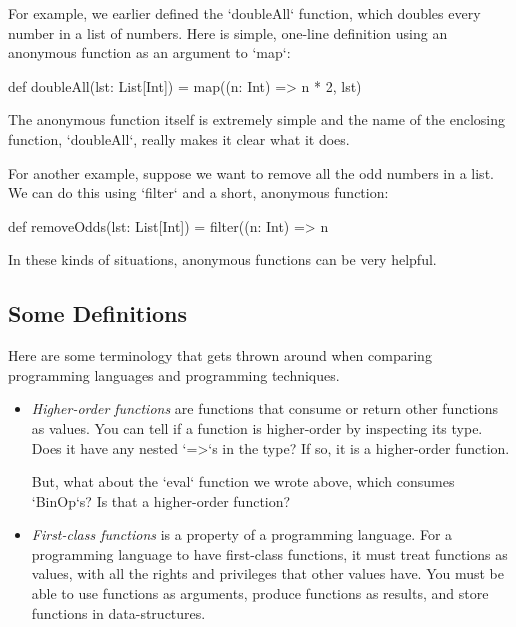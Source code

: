 \documentclass{book}
\begin{document}
For example, we earlier defined the `doubleAll` function, which doubles
every number in a list of numbers. Here is simple, one-line definition
using an anonymous function as an argument to `map`:

\begin{scalacode}
def doubleAll(lst: List[Int]) = map((n: Int) => n * 2, lst)
\end{scalacode}

The anonymous function itself is extremely simple and the name of the enclosing
function, `doubleAll`, really makes it clear what it does.

For another example, suppose we want to remove all the odd numbers
in a list. We can do this using `filter` and a short, anonymous function:

\begin{scalacode}
def removeOdds(lst: List[Int]) = filter((n: Int) => n %
\end{scalacode}

In these kinds of situations, anonymous functions can be very helpful.

\subsection{Some Definitions}

Here are some terminology that gets thrown around when comparing programming
languages and programming techniques.

\begin{itemize}

  \item \emph{Higher-order functions} are functions that consume or return other
  functions   as values. You can tell if a function is higher-order by inspecting
  its type. Does it have any nested `=>`s in the type? If so, it is a higher-order
  function.

  But, what about the `eval` function we wrote above, which consumes `BinOp`s?
  Is that a higher-order function?

  \item \emph{First-class functions} is a property of a programming language. For
  a programming language to have first-class functions, it must treat functions
  as values, with all the rights and privileges that other values have. You must
  be able to use functions as arguments, produce functions as results, and store
  functions in data-structures.

\end{itemize}
\end{document}

